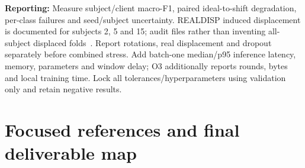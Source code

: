 \documentclass[10pt]{article}
\begin{document}
\textbf{Reporting:} Measure subject/client macro-F1, paired ideal-to-shift degradation, per-class failures and seed/subject uncertainty. REALDISP induced displacement is documented for subjects 2, 5 and 15; audit files rather than inventing all-subject displaced folds~\cite{ombanos}. Report rotations, real displacement and dropout separately before combined stress. Add batch-one median/p95 inference latency, memory, parameters and window delay; O3 additionally reports rounds, bytes and local training time. Lock all tolerances/hyperparameters using validation only and retain negative results.

\clearpage
\section*{Focused references and final deliverable map}
\begingroup
\renewcommand{\refname}{Three core papers and optional/background references}
\end{document}
